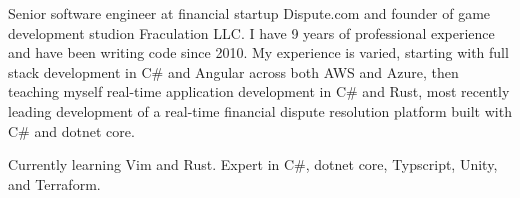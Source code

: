 

\begin{cvparagraph}

Senior software engineer at financial startup Dispute.com and founder of game development studion Fraculation LLC.\@
I have 9 years of professional experience and have been writing code since 2010. My experience is varied, starting with 
full stack development in C\# and Angular across both AWS and Azure, then teaching myself real-time application development in C\# and Rust,
most recently leading development of a real-time financial dispute resolution platform built with C\# and dotnet core.

Currently learning Vim and Rust. Expert in C\#, dotnet core, Typscript, Unity, and Terraform.

\end{cvparagraph}
